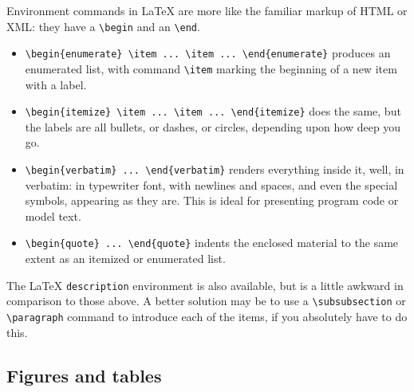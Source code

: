 \documentclass[dissertation]{softeng}
\begin{document}
Environment commands in {\LaTeX} are more like the familiar markup of
HTML or XML: they have a \verb|\begin| and an \verb|\end|.  
\begin{itemize}\raggedright
\item \verb|\begin{enumerate} \item ... \item ... \end{enumerate}|
  produces an enumerated list, with command \verb|\item| marking the
  beginning of a new item with a label. 
\item \verb|\begin{itemize} \item ... \item ... \end{itemize}| does
  the same, but the labels are all bullets, or dashes, or circles,
  depending upon how deep you go.
\item \verb|\|\verb|begin{verbatim} ... \end{verbatim}| renders
everything inside it, well, in verbatim: in typewriter font, with
newlines and spaces, and even the special symbols, appearing as they
are.  This is ideal for presenting program code or model text.
\item \verb|\begin{quote} ... \end{quote}| indents the enclosed
  material to the same extent as an itemized or enumerated list.
\end{itemize}
The {\LaTeX} \verb|description| environment is also available, but is
a little awkward in comparison to those above.  A better solution may
be to use a \verb|\subsubsection| or \verb|\paragraph| command to
introduce each of the items, if you absolutely have to do this.  

\subsection{Figures and tables}
\label{sec:tabular}
\end{document}
